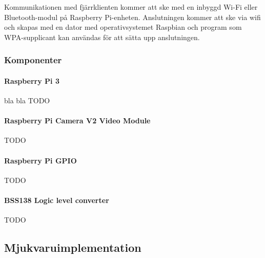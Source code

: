 \documentclass[designspec/spec.tex]{subfiles}
\begin{document}
Kommunikationen med fjärrklienten kommer att ske med en inbyggd Wi-Fi eller
Bluetooth-modul på Raspberry Pi-enheten. Anslutningen kommer att ske via wifi
och skapas med en dator med operativsystemet Raspbian och program som
WPA-supplicant kan användas för att sätta upp anslutningen.

\subsubsection{Komponenter}
\paragraph{Raspberry Pi 3} bla bla TODO
\paragraph{Raspberry Pi Camera V2 Video Module} TODO
\paragraph{Raspberry Pi GPIO} TODO
\paragraph{BSS138 Logic level converter} TODO

\subsection{Mjukvaruimplementation}
\end{document}
